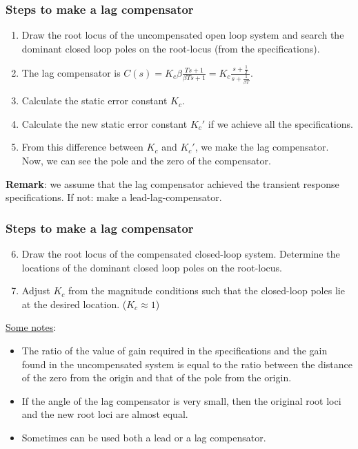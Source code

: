 \begin{frame}
	\frametitle{Steps to make a lag compensator}
		\begin{enumerate}
			\item Draw the root locus of the uncompensated open loop system and search the dominant closed loop poles on the root-locus (from the specifications).
			\item The lag compensator is $C(s)=K_c \beta\frac{Ts+1}{\beta Ts+1}= K_c\frac{s+\frac{1}{T}}{s+\frac{1}{\beta T}}$.
			\item Calculate the static error constant $K_c$. 
			\item Calculate the new static error constant $K_c'$ if we achieve all the specifications.
			\item From this difference between $K_c$ and $K_c'$, we make the lag compensator. Now, we can see the pole and the zero of the compensator. 
		\end{enumerate}
		\textbf{Remark}: we assume that the lag compensator achieved the transient response specifications. If not: make a lead-lag-compensator.
\end{frame}

\begin{frame}
	\frametitle{Steps to make a lag compensator}
		\begin{enumerate}
			\setcounter{enumi}{5}
			\item Draw the root locus of the compensated closed-loop system. Determine the locations of the dominant closed loop poles on the root-locus. 
			\item Adjust $K_c$ from the magnitude conditions such that the closed-loop poles lie at the desired location. ($K_c\approx 1$)
		\end{enumerate}
		\vspace{3mm}
		
		\underline{Some notes}:
		\begin{itemize}
			\item The ratio of the value of gain required in the specifications and the gain found in the uncompensated system is equal to the ratio between the distance of the zero from the origin and that of the pole from the origin.
			\item If the angle of the lag compensator is very small, then the original root loci and the new root loci are almost equal.
			\item Sometimes can be used both a lead or a lag compensator. 
		\end{itemize}
\end{frame}

